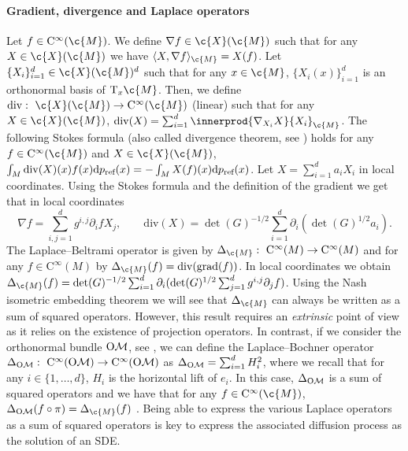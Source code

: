 \paragraph{Gradient, divergence and Laplace operators}
Let \(f \in \mathrm{C}^{\infty}(\c{M})\).
We define \(\nabla f \in \c{X}(\c{M})\) such that for any \(X \in \c{X}(\c{M})\) we have \(\langle X, \nabla f \rangle_{\c{M}} = X(f)\).
Let \(\{X_i\}_{i=1}^d \in \c{X}(\c{M})^d\) such that for any \(x \in \c{M}\), \(\{X_i(x)\}_{i=1}^d\) is an orthonormal basis of \(\mathrm{T}_x \c{M}\).
Then, we define \(\mathrm{div}: \ \c{X}(\c{M}) \to \mathrm{C}^\infty(\c{M})\) (linear) such that for any \(X \in \c{X}(\c{M})\), \(\mathrm{div}(X) = \sum_{i=1}^d \innerprod{\nabla_{X_i}X}{X_i}_{\c{M}}\).
The following Stokes formula (also called divergence theorem, see \textcite[p.51]{lee2018introduction}) holds for any \(f \in \mathrm{C}^\infty(\c{M})\) and \(X \in \c{X}(\c{M})\), \(\int_{M} \mathrm{div}(X)(x) f(x) \mathrm{d} p_{\textup{ref}}(x) = - \int_M X(f)(x) \mathrm{d} p_{\textup{ref}}(x)\).
Let \(X = \sum_{i=1}^d a_i X_i\) in local coordinates.
Using the Stokes formula and the definition of the gradient we get that in local coordinates \begin{equation} { \nabla f = \sum_{i,j=1}^d g^{i,j} \partial_i f X_j , \qquad \mathrm{div}(X) = \det(G)^{-1/2} \sum_{i=1}^d \partial_i(\det(G)^{1/2} a_i) .
	}
\end{equation}
The Laplace--Beltrami operator is given by \(\Delta_{\c{M}} : \ \mathrm{C}^\infty(M) \to \mathrm{C}^\infty(M)\) and for any \(f \in \mathrm{C}^\infty(M)\) by \(\Delta_{\c{M}}(f) = \mathrm{div}(\grad(f))\).
In local coordinates we obtain \(\Delta_{\c{M}}(f) = \det(G)^{-1/2} \sum_{i=1}^d \partial_i (\det(G)^{1/2} \sum_{j=1}^d g^{i,j} \partial_j f)\).
Using the Nash isometric embedding theorem \parencite{gunther1991isometric} we will see that \(\Delta_{\c{M}}\) can always be written as a sum of squared operators.
However, this result requires an \emph{extrinsic} point of view as it relies on the existence of projection operators.
In contrast, if we consider the orthonormal bundle \(\mathrm{O}\mathcal{M}\), see \cite[Chapter 2]{hsu2002stochastic}, we can define the Laplace--Bochner operator \(\Delta_{\OM}: \ \mathrm{C}^\infty(\OM) \to \mathrm{C}^\infty(\OM)\) as \(\Delta_{\mathrm{O}\mathcal{M}} = \sum_{i=1}^d H_i^2\), where we recall that for any \(i \in \{1, \dots, d\}\), \(H_i\) is the horizontal lift of \(e_i\).
In this case, \(\Delta_{\mathrm{O}\mathcal{M}}\) is a sum of squared operators and we have that for any \(f \in \mathrm{C}^\infty(\c{M})\), \(\Delta_{\OM}(f \circ \pi) = \Delta_{\c{M}}(f)\) \cite[see][Proposition 3.1.2]{hsu2002stochastic}.
Being able to express the various Laplace operators as a sum of squared operators is key to express the associated diffusion process as the solution of an SDE.

